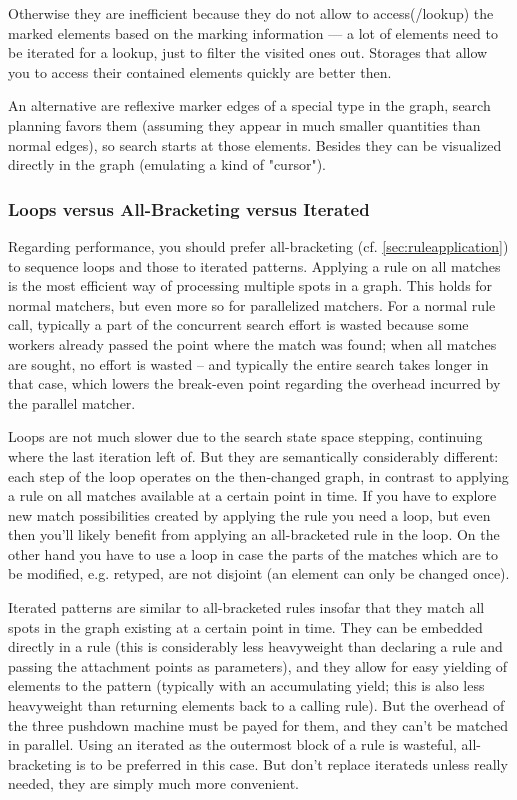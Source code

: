 Otherwise they are inefficient because they do not allow to access(/lookup) the marked elements based on the marking information ---
a lot of elements need to be iterated for a lookup, just to filter the visited ones out.
Storages that allow you to access their contained elements quickly are better then.

An alternative are reflexive marker edges of a special type in the graph, search planning favors them (assuming they appear in much smaller quantities than normal edges), so search starts at those elements. 
Besides they can be visualized directly in the graph (emulating a kind of "cursor").

\subsubsection*{Loops versus All-Bracketing versus Iterated}
Regarding performance, you should prefer all-bracketing (cf. \ref{sec:ruleapplication}) to sequence loops and those to iterated patterns.
Applying a rule on all matches is the most efficient way of processing multiple spots in a graph.
This holds for normal matchers, but even more so for parallelized matchers.
For a normal rule call, typically a part of the concurrent search effort is wasted because some workers already passed the point where the match was found; 
when all matches are sought, no effort is wasted -- and typically the entire search takes longer in that case, which lowers the break-even point regarding the overhead incurred by the parallel matcher.

Loops are not much slower due to the search state space stepping, continuing where the last iteration left of.
But they are semantically considerably different: each step of the loop operates on the then-changed graph, in contrast to applying a rule on all matches available at a certain point in time.
If you have to explore new match possibilities created by applying the rule you need a loop, but even then you'll likely benefit from applying an all-bracketed rule in the loop.
On the other hand you have to use a loop in case the parts of the matches which are to be modified, e.g. retyped, are not disjoint (an element can only be changed once).

Iterated patterns are similar to all-bracketed rules insofar that they match all spots in the graph existing at a certain point in time.
They can be embedded directly in a rule (this is considerably less heavyweight than declaring a rule and passing the attachment points as parameters), and they allow for easy yielding of elements to the pattern (typically with an accumulating yield; this is also less heavyweight than returning elements back to a calling rule).
But the overhead of the three pushdown machine must be payed for them, and they can't be matched in parallel.
Using an iterated as the outermost block of a rule is wasteful, all-bracketing is to be preferred in this case.
But don't replace iterateds unless really needed, they are simply much more convenient.

